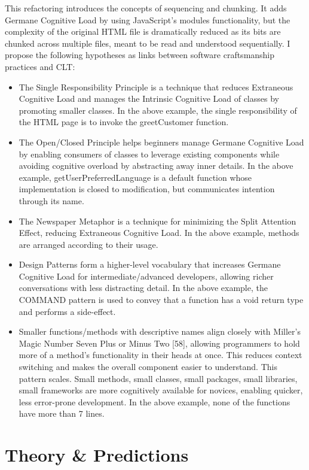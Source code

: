 This refactoring introduces the concepts of sequencing and chunking. It adds Germane Cognitive Load by using JavaScript’s modules functionality, but the complexity of the original HTML file is dramatically reduced as its bits are chunked across multiple files, meant to be read and understood sequentially.
I propose the following hypotheses as links between software craftsmanship practices and CLT:
\begin{itemize}
	\item The Single Responsibility Principle is a technique that reduces Extraneous Cognitive Load and manages the Intrinsic Cognitive Load of classes by promoting smaller classes. In the above example, the single responsibility of the HTML page is to invoke the greetCustomer function.
	\item The Open/Closed Principle helps beginners manage Germane Cognitive Load by enabling consumers of classes to leverage existing components while avoiding cognitive overload by abstracting away inner details. In the above example, getUserPreferredLanguage is a default function whose implementation is closed to modification, but communicates intention through its name.
	\item The Newspaper Metaphor is a technique for minimizing the Split Attention Effect, reducing Extraneous Cognitive Load. In the above example, methods are arranged according to their usage.
	\item Design Patterns form a higher-level vocabulary that increases Germane Cognitive Load for intermediate/advanced developers, allowing richer conversations with less distracting detail. In the above example, the COMMAND pattern is used to convey that a function has a void return type and performs a side-effect.
	\item Smaller functions/methods with descriptive names align closely with Miller’s Magic Number Seven Plus or Minus Two [58], allowing programmers to hold more of a method’s functionality in their heads at once. This reduces context switching and makes the overall component easier to understand. This pattern scales. Small methods, small classes, small packages, small libraries, small frameworks are more cognitively available for novices, enabling quicker, less error-prone development. In the above example, none of the functions have more than 7 lines.
\end{itemize}

\section{Theory \& Predictions}

